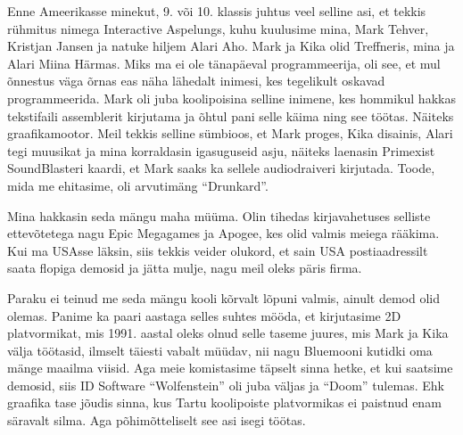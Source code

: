 Enne Ameerikasse minekut, 9. või 10. klassis juhtus veel selline asi, et tekkis rühmitus nimega Interactive 
Aspelungs, kuhu kuulusime mina, Mark Tehver, 
Kristjan Jansen ja natuke hiljem Alari 
Aho. Mark ja Kika olid 
Treffneris, mina ja Alari Miina 
Härmas. Miks ma 
ei ole tänapäeval programmeerija, oli see, et mul õnnestus väga õrnas eas näha 
lähedalt inimesi, kes tegelikult oskavad programmeerida. Mark oli juba koolipoisina selline inimene, kes hommikul hakkas tekstifaili assemblerit 
kirjutama ja õhtul pani selle käima ning see töötas. Näiteks 
graafikamootor. Meil tekkis selline sümbioos, et 
Mark proges, Kika disainis, Alari tegi muusikat ja mina korraldasin igasuguseid asju, näiteks laenasin Primexist SoundBlasteri kaardi, et Mark 
saaks ka sellele audiodraiveri kirjutada. Toode, 
mida me ehitasime, oli arvutimäng \enquote{Drunkard}.

Mina hakkasin seda mängu maha 
müüma. Olin tihedas kirjavahetuses selliste ettevõtetega nagu Epic Megagames ja Apogee, kes olid valmis meiega rääkima. 
Kui ma USAsse läksin, siis tekkis veider olukord, et sain USA 
postiaadressilt saata flopiga demosid ja jätta mulje, nagu meil oleks 
päris firma. 

Paraku ei teinud me seda mängu kooli kõrvalt lõpuni valmis, ainult demod olid 
olemas. Panime ka paari aastaga selles suhtes mööda, et kirjutasime 2D 
platvormikat, mis 1991. aastal oleks olnud selle taseme juures, mis 
Mark ja Kika välja
töötasid, ilmselt täiesti vabalt müüdav, nii nagu 
Bluemooni kutidki oma mänge maailma viisid. Aga meie 
komistasime täpselt sinna hetke, et kui saatsime demosid, siis ID 
Software \enquote{Wolfenstein} oli juba 
väljas ja \enquote{Doom} 
tulemas. Ehk graafika tase jõudis sinna, kus Tartu koolipoiste 
platvormikas ei paistnud enam säravalt silma. Aga põhimõtteliselt see asi isegi töötas.



